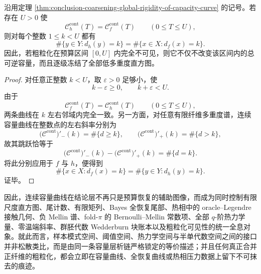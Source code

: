 \begin{corollary}[低多重度扇区的局部不可见性判据]\label{cor:conclusion-low-multiplicity-sector-local-invisibility}
沿用定理 \ref{thm:conclusion-coarsening-global-rigidity-of-capacity-curve} 的记号。若存在 \(U>0\) 使
\[
\mathcal C_h^{\mathrm{cont}}(T)=\mathcal C_f^{\mathrm{cont}}(T)
\qquad (0\le T\le U),
\]
则对每个整数 \(1\le k<U\) 都有
\[
\#\{y\in Y:d_h(y)=k\}
=
\#\{x\in X:d_f(x)=k\}.
\]
因此，若粗粒化在预算区间 \([0,U]\) 内完全不可见，则它不仅不改变该区间内的总可逆容量，而且逐级冻结了全部低多重度直方图。
\end{corollary}
\begin{proof}
对任意正整数 \(k<U\)，取 \(\varepsilon>0\) 足够小，使
\[
k-\varepsilon\ge 0,
\qquad
k+\varepsilon<U.
\]
由于
\[
\mathcal C_f^{\mathrm{cont}}(T)=\mathcal C_h^{\mathrm{cont}}(T)
\qquad (0\le T\le U),
\]
两条曲线在 \(k\) 左右邻域内完全一致。另一方面，对任意有限纤维多重度谱，连续容量曲线在整数点的左右斜率分别为
\[
\bigl(\mathcal C^{\mathrm{cont}}\bigr)'_-(k)=\#\{d\ge k\},
\qquad
\bigl(\mathcal C^{\mathrm{cont}}\bigr)'_+(k)=\#\{d>k\},
\]
故其跳跃恰等于
\[
\bigl(\mathcal C^{\mathrm{cont}}\bigr)'_-(k)-\bigl(\mathcal C^{\mathrm{cont}}\bigr)'_+(k)=\#\{d=k\}.
\]
将此分别应用于 \(f\) 与 \(h\)，便得到
\[
\#\{x\in X:d_f(x)=k\}
=
\#\{y\in Y:d_h(y)=k\}.
\]
证毕。
\end{proof}





\noindent
因此，连续容量曲线在结论层不再只是预算恢复的辅助图像，而成为同时控制有限尺度直方图、尾计数、有限矩列、Bayes 全恢复尾部、热相中的 oracle--Legendre 接触几何、负 Mellin 谱、fold-\(\pi\) 的 Bernoulli--Mellin 常数项、全部 \(q\)-阶热力学量、零温端斜率、群胚代数 Wedderburn 块账本以及粗粒化可见性的统一全息对象。就此而言，样本模式空间、阈值空间、热力学空间与半单代数空间之间的接口并非松散类比，而是由同一条容量层析链严格锁定的等价描述；并且任何真正合并正纤维的粗粒化，都会立即在容量曲线、全恢复曲线或热相压力数据上留下不可抹去的痕迹。

\endinput
